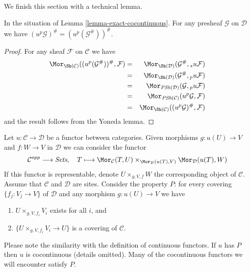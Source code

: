 \noindent
We finish this section with a technical lemma.

\begin{lemma}
\label{lemma-technical-pu}
In the situation of Lemma \ref{lemma-exact-cocontinuous}.
For any presheaf $\mathcal{G}$ on $\mathcal{D}$
we have $(u^p\mathcal{G})^\# = (u^p(\mathcal{G}^\#))^\#$.
\end{lemma}

\begin{proof}
For any sheaf $\mathcal{F}$ on $\mathcal{C}$ we have
\begin{eqnarray*}
\Mor_{\Sh(\mathcal{C})}((u^p(\mathcal{G}^\#))^\#, \mathcal{F})
& = &
\Mor_{\Sh(\mathcal{D})}(\mathcal{G}^\#, {}_su\mathcal{F}) \\
& = &
\Mor_{\Sh(\mathcal{D})}(\mathcal{G}^\#, {}_pu\mathcal{F}) \\
& = &
\Mor_{\textit{PSh}(\mathcal{D})}(\mathcal{G}, {}_pu\mathcal{F}) \\
& = &
\Mor_{\textit{PSh}(\mathcal{C})}(u^p\mathcal{G}, \mathcal{F}) \\
& = &
\Mor_{\Sh(\mathcal{C})}((u^p\mathcal{G})^\#, \mathcal{F})
\end{eqnarray*}
and the result follows from the Yoneda lemma.
\end{proof}

\begin{remark}
\label{remark-cartesian-cocontinuous}
Let $u : \mathcal{C} \to \mathcal{D}$ be a functor between categories.
Given morphisms $g : u(U) \to V$ and $f : W \to V$ in $\mathcal{D}$
we can consider the functor
$$
\mathcal{C}^{opp} \longrightarrow \textit{Sets},\quad
T \longmapsto
\Mor_\mathcal{C}(T, U)
\times_{\Mor_\mathcal{D}(u(T), V)}
\Mor_\mathcal{D}(u(T), W)
$$
If this functor is representable, denote $U \times_{g, V, f} W$
the corresponding object of $\mathcal{C}$.
Assume that $\mathcal{C}$ and $\mathcal{D}$ are sites.
Consider the property $P$: for every covering $\{f_j : V_j \to V\}$
of $\mathcal{D}$ and any morphism $g : u(U) \to V$ we have
\begin{enumerate}
\item $U \times_{g, V, f_i} V_i$ exists for all $i$, and
\item $\{U \times_{g, V, f_i} V_i \to U\}$ is a covering of $\mathcal{C}$.
\end{enumerate}
Please note the similarity with the definition of continuous
functors. If $u$ has $P$ then $u$ is cocontinuous (details omitted).
Many of the cocontinuous functors we will encounter satisfy $P$.
\end{remark}


